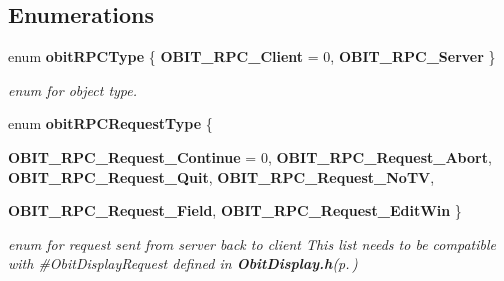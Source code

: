 \subsection*{Enumerations}
\begin{CompactItemize}
\item 
enum {\bf obit\-RPCType} \{ {\bf OBIT\_\-RPC\_\-Client} =  0, 
{\bf OBIT\_\-RPC\_\-Server}
 \}
\begin{CompactList}\small\item\em enum for object type. \item\end{CompactList}\item 
enum {\bf obit\-RPCRequest\-Type} \{ \par
{\bf OBIT\_\-RPC\_\-Request\_\-Continue} =  0, 
{\bf OBIT\_\-RPC\_\-Request\_\-Abort}, 
{\bf OBIT\_\-RPC\_\-Request\_\-Quit}, 
{\bf OBIT\_\-RPC\_\-Request\_\-No\-TV}, 
\par
{\bf OBIT\_\-RPC\_\-Request\_\-Field}, 
{\bf OBIT\_\-RPC\_\-Request\_\-Edit\-Win}
 \}
\begin{CompactList}\small\item\em enum for request sent from server back to client This list needs to be compatible with \#Obit\-Display\-Request defined in {\bf Obit\-Display.h}{\rm (p.\,\pageref{ObitDisplay_8h})} \item\end{CompactList}\end{CompactItemize}
